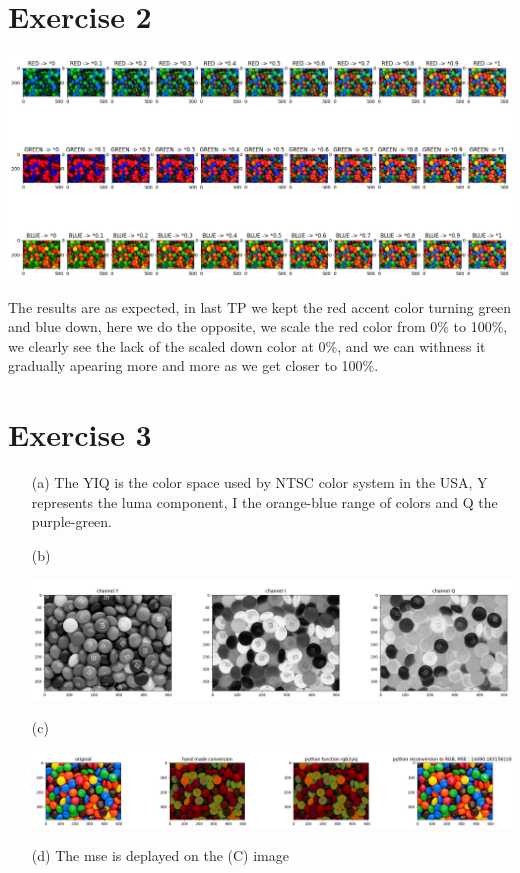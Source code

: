 \documentclass[a4paper]{article}
\begin{document}
\section*{Exercise 2}
\begin{center}
\includegraphics[width=1\textwidth]{images/exercice_2.PNG}\\[1cm] 
\end{center}
The results are as expected, in last TP we kept the red accent color turning green and blue down, here we do the opposite, we scale the red color from 0$\%$ to 100$\%$, we clearly see the lack of the scaled down color at 0$\%$, and we can withness it gradually apearing more and more as we get closer to 100$\%$.
\section*{Exercise 3}
\begin{itemize}
\item[(a)] The YIQ is the color space used by NTSC color system in the USA, Y represents the luma component, I the orange-blue range of colors and Q the purple-green.
\item[(b)]
\begin{center}
\includegraphics[width=1\textwidth]{images/exercice_3_b.PNG}\\[1cm] 
\end{center}
\item[(c)]
\begin{center}
\includegraphics[width=1\textwidth]{images/exercice_3_c.PNG}\\[1cm] 
\end{center}
\item[(d)] The mse is deplayed on the (C) image
\end{itemize}
\end{document}
